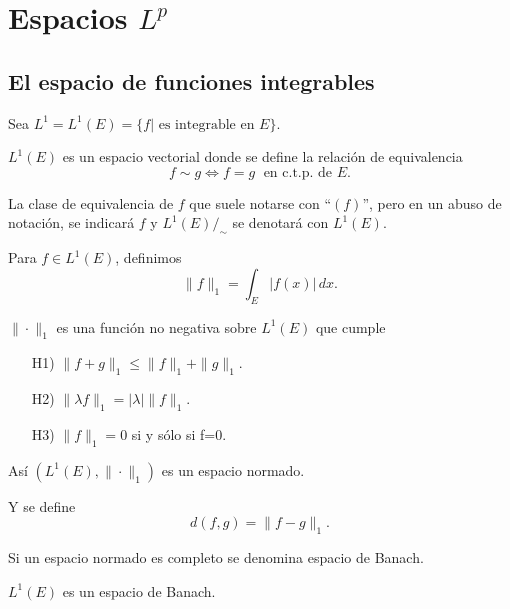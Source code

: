 \chapter{Espacios $L^p$}

\section{El espacio de funciones integrables}
Sea
$
L^1=L^1(E)=
\{
f|\mbox{ es integrable en } E
\}.
$

$L^1(E)$ es un espacio vectorial donde se define la relaci\'on de equivalencia
\[
f \sim g \Longleftrightarrow f=g \;\mbox{ en c.t.p. de } E.
\]   

 
La clase de equivalencia de $f$  que suele notarse con ``$(f)$'', pero en un abuso de notaci\'on, se indicar\'a  $f$
y $L^1(E)/_{\sim}$ se denotar\'a con $L^1(E)$.

Para $f\in L^1(E)$, definimos
\[
\|f\|_1=\int_E|f(x)|\,dx.
\]

$\| \cdot \|_1$ es una funci\'on no negativa sobre $L^1(E)$ que cumple
\begin{enumerate}
    \item [H1)] $\|f+g\|_1\leq \|f\|_1+\|g\|_1$.
    \item [H2)] $\|\lambda f\|_1=|\lambda|\|f\|_1$.
    \item [H3)] $\|f\|_1=0$ si y s\'olo si f=0.
\end{enumerate}

As\'i $(L^1(E),\|\cdot\|_1)$ es un espacio normado. 

Y se define 
\[
d(f,g)=\|f-g\|_1.
\]

Si un espacio normado es completo se denomina espacio de Banach. 

\begin{teorema}{}\label{teorema:L1-completo}
$L^1(E)$ es un espacio de Banach.
\end{teorema}

